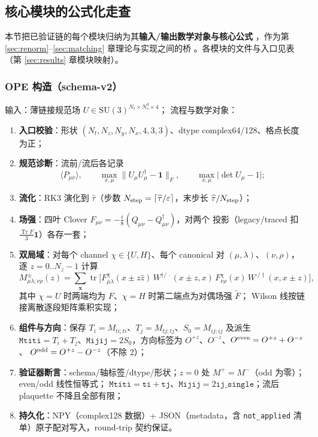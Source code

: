 \documentclass[11pt,a4paper]{ctexart}
\newcommand{\eps}{\varepsilon}
\newcommand{\tr}{\operatorname{Tr}}
\newcommand{\trc}{\operatorname{tr}}
\newcommand{\code}[1]{\texttt{#1}}
\newcommand{\zzh}{\widehat{\tau}}
\begin{document}
\subsection{核心模块的公式化走查}
\label{sec:walkthrough}

本节把已验证链的每个模块归纳为其\textbf{输入/输出数学对象与核心公式}
，作为第 \ref{sec:renorm}--\ref{sec:matching} 章理论与实现之间的桥
。各模块的文件与入口见表（第 \ref{sec:results} 章模块映射）。

\subsubsection{OPE 构造（schema-v2）}

输入：薄链接规范场 $U\in\mathrm{SU}(3)^{N_t\times N_s^3\times4}$；
流程与数学对象：

\begin{enumerate}
  \item \textbf{入口校验}：形状 $(N_t,N_z,N_y,N_x,4,3,3)$、dtype
  complex64/128、格点长度为正；
  \item \textbf{规范诊断}：流前/流后各记录
  \begin{equation}
  \langle P_{\mu\nu}\rangle,\qquad
  \max_{x,\mu}\lVert U_\mu U_\mu^\dagger-\mathbf1\rVert_F,\qquad
  \max_{x,\mu}\lvert\det U_\mu - 1\rvert;
  \end{equation}
  \item \textbf{流化}：RK3 演化到 $\zzh$（步数
  $N_{\rm step}=\lceil\zzh/\eps\rceil$，末步长 $\zzh/N_{\rm step}$）；
  \item \textbf{场强}：四叶 Clover
  $F_{\mu\nu}=-\frac{i}{8}(Q_{\mu\nu}-Q_{\mu\nu}^\dagger)$，对两个
  投影（legacy/traced 扣 $\frac{\tr F}{3}\mathbf1$）各存一套；
  \item \textbf{双局域}：对每个 channel $\chi\in\{U,H\}$、每个
  canonical 对 $(\mu,\lambda)$、$(\nu,\rho)$，逐 $z=0..N_z-1$ 计算
  \begin{equation}
  M_{\mu\lambda;\nu\rho}^{\pm}(z)
  = \sum_{\boldsymbol x}\trc\bigl[
  F_{\mu\lambda}^{\chi}(x\pm z\hat z)\,
  W^{\dagger/\,\cdot}(x\pm z,x)\,
  F_{\nu\rho}^{\chi}(x)\,
  W^{\cdot/\dagger}(x,x\pm z)\bigr],
  \end{equation}
  其中 $\chi=U$ 时两端均为 $F$、$\chi=H$ 时第二端点为对偶场强
  $\widetilde F$； Wilson 线按链接离散逐段矩阵乘积实现；
  \item \textbf{组件与方向}：保存
  $T_i=M_{ti;ti}$、$T_j=M_{tj;tj}$、$S_0=M_{ij;ij}$ 及派生
  $\code{Mtiti}=T_i+T_j$、$\code{Mijij}=2S_0$，方向标签为
  $O^{+z}$、$O^{-z}$、$O^{\rm even}=O^{+z}+O^{-z}$、
  $O^{\rm odd}=O^{+z}-O^{-z}$（不除 2）；
  \item \textbf{验证器断言}：schema/轴标签/dtype/形状；$z=0$ 处
  $M^+=M^-$（odd 为零）；even/odd 线性恒等式；
  $\code{Mtiti}=\code{ti}+\code{tj}$、$\code{Mijij}
  =2\code{ij\_single}$；流后 plaquette 不降且全部有限；
  \item \textbf{持久化}：NPY（complex128 数据）+ JSON（metadata，含
  \code{not\_applied} 清单）原子配对写入，round-trip 契约保证。
\end{enumerate}
\end{document}
